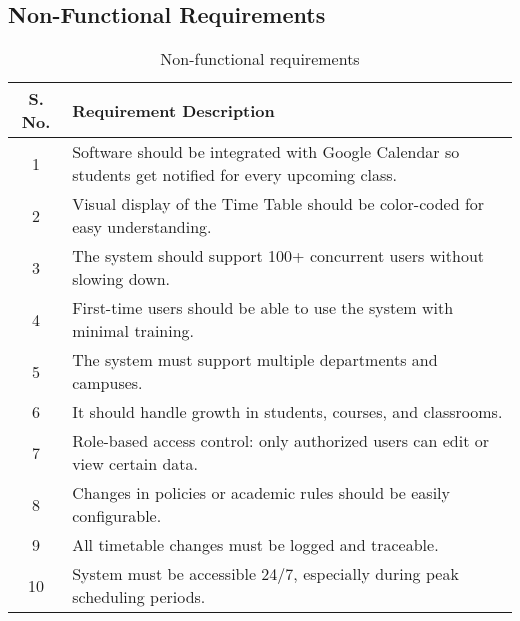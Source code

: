 \documentclass[12pt]{article}
\begin{document}
\subsection*{Non-Functional Requirements}
\begin{table}[H]
\centering
\begin{tabular}{|c|p{12cm}|}
\hline
\textbf{S. No.} & \textbf{Requirement Description} \\ \hline
1 & Software should be integrated with Google Calendar so students get notified for every upcoming class. \\ \hline
2 & Visual display of the Time Table should be color-coded for easy understanding. \\ \hline
3 & The system should support 100+ concurrent users without slowing down.\\ \hline
4 & First-time users should be able to use the system with minimal training. \\ \hline
5 & The system must support multiple departments and campuses.\\ \hline
6 & It should handle growth in students, courses, and classrooms.\\ \hline
7 & Role-based access control: only authorized users can edit or view certain data. \\ \hline
8 & Changes in policies or academic rules should be easily configurable. \\ \hline 
9 & All timetable changes must be logged and traceable. \\ \hline
10 & System must be accessible 24/7, especially during peak scheduling periods. \\ \hline 

\end{tabular}
\caption{Non-functional requirements}
\label{tab:nonfunctional}
\end{table}
\end{document}
